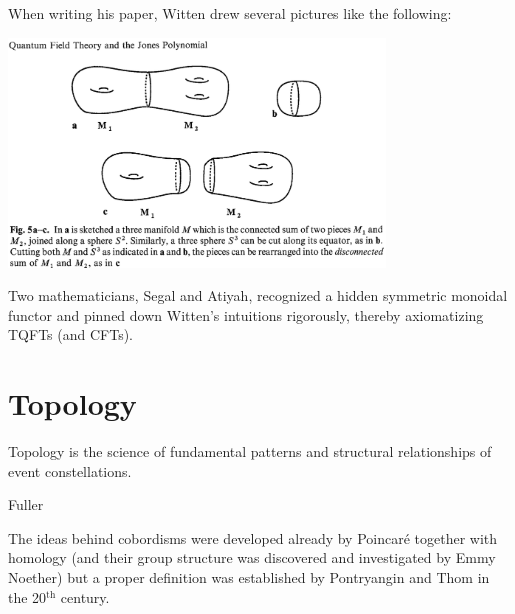 When writing his paper, Witten drew several pictures like the following:
\begin{center}
\includegraphics[width=10cm]{images/Lecture 1/witten.png}
\end{center}
Two mathematicians, Segal and Atiyah, recognized a hidden symmetric monoidal functor and pinned down  Witten's intuitions rigorously, thereby axiomatizing TQFTs (and CFTs).

\section{Topology}
\begin{flushleft}
\epigraph{Topology is the science of fundamental patterns and structural relationships of event constellations.}{Fuller}
\end{flushleft}
The ideas behind cobordisms were developed already by Poincaré together with homology (and their group structure was discovered and investigated by Emmy Noether) but a proper definition was established by Pontryangin and Thom in the 20$^{\text{th}}$ century.

